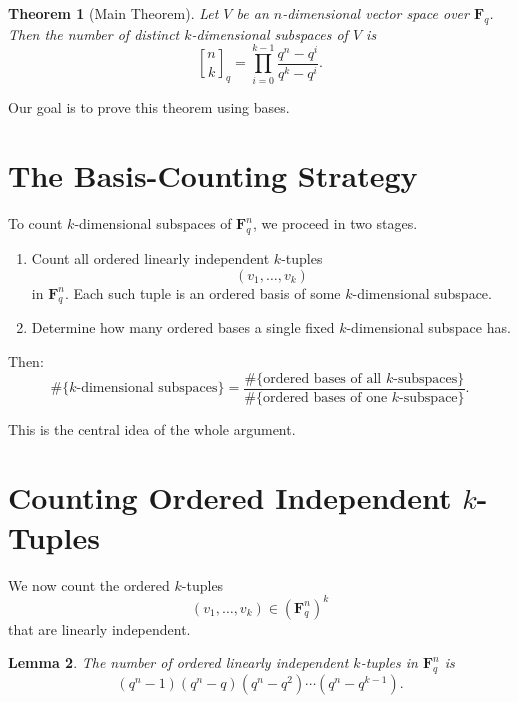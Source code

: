\documentclass[11pt]{article}
\newtheorem{theorem}{Theorem}[section]
\newtheorem{lemma}[theorem]{Lemma}
\theoremstyle{definition}
\theoremstyle{remark}
\newcommand{\F}{\mathbf{F}}
\newcommand{\qbinom}[2]{\genfrac{[}{]}{0pt}{}{#1}{#2}_q}
\begin{document}
	\begin{theorem}[Main Theorem]
		Let \(V\) be an \(n\)-dimensional vector space over \(\F_q\). Then the number of distinct \(k\)-dimensional subspaces of \(V\) is
		\[
		\boxed{
			\qbinom{n}{k}
			=
			\prod_{i=0}^{k-1}\frac{q^n-q^i}{q^k-q^i}
		}.
		\]
	\end{theorem}
	
	Our goal is to prove this theorem using bases.
	
	\section{The Basis-Counting Strategy}
	
	To count \(k\)-dimensional subspaces of \(\F_q^n\), we proceed in two stages.
	
	\begin{enumerate}[label=\arabic*.]
		\item Count all ordered linearly independent \(k\)-tuples
		\[
		(v_1,\dots,v_k)
		\]
		in \(\F_q^n\). Each such tuple is an ordered basis of some \(k\)-dimensional subspace.
		\item Determine how many ordered bases a single fixed \(k\)-dimensional subspace has.
	\end{enumerate}
	
	Then:
	\[
	\#\{\text{\(k\)-dimensional subspaces}\}
	=
	\frac{\#\{\text{ordered bases of all \(k\)-subspaces}\}}
	{\#\{\text{ordered bases of one \(k\)-subspace}\}}.
	\]
	
	This is the central idea of the whole argument.
	
	\section{Counting Ordered Independent \(k\)-Tuples}
	
	We now count the ordered \(k\)-tuples
	\[
	(v_1,\dots,v_k)\in (\F_q^n)^k
	\]
	that are linearly independent.
	
	\begin{lemma}
		The number of ordered linearly independent \(k\)-tuples in \(\F_q^n\) is
		\[
		(q^n-1)(q^n-q)(q^n-q^2)\cdots(q^n-q^{k-1}).
		\]
	\end{lemma}
	
\end{document}
